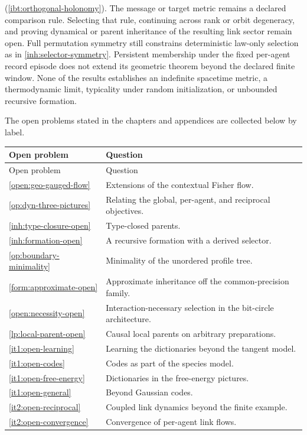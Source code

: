 (\cref{ibt:orthogonal-holonomy}). The message or target metric remains a declared comparison rule. Selecting that rule, continuing across rank or orbit degeneracy, and proving dynamical or parent inheritance of the resulting link sector remain open. Full permutation symmetry still constrains deterministic law-only selection as in \cref{inh:selector-symmetry}. Persistent membership under the fixed per-agent record episode does not extend its geometric theorem beyond the declared finite window. None of the results establishes an indefinite spacetime metric, a thermodynamic limit, typicality under random initialization, or unbounded recursive formation.

The open problems stated in the chapters and appendices are collected below by label.
\begingroup
\small
\begin{longtable}{@{}p{}p{}@{}}
Open problem & Question \\
\endfirsthead
Open problem & Question \\
\endhead
\cref{open:geo-gauged-flow} & Extensions of the contextual Fisher flow. \\
\cref{op:dyn-three-pictures} & Relating the global, per-agent, and reciprocal objectives. \\
\cref{inh:type-closure-open} & Type-closed parents. \\
\cref{inh:formation-open} & A recursive formation with a derived selector. \\
\cref{op:boundary-minimality} & Minimality of the unordered profile tree. \\
\cref{form:approximate-open} & Approximate inheritance off the common-precision family. \\
\cref{open:necessity-open} & Interaction-necessary selection in the bit-circle architecture. \\
\cref{lp:local-parent-open} & Causal local parents on arbitrary preparations. \\
\cref{it1:open-learning} & Learning the dictionaries beyond the tangent model. \\
\cref{it1:open-codes} & Codes as part of the species model. \\
\cref{it1:open-free-energy} & Dictionaries in the free-energy pictures. \\
\cref{it1:open-general} & Beyond Gaussian codes. \\
\cref{it2:open-reciprocal} & Coupled link dynamics beyond the finite example. \\
\cref{it2:open-convergence} & Convergence of per-agent link flows. \\

\end{longtable}
